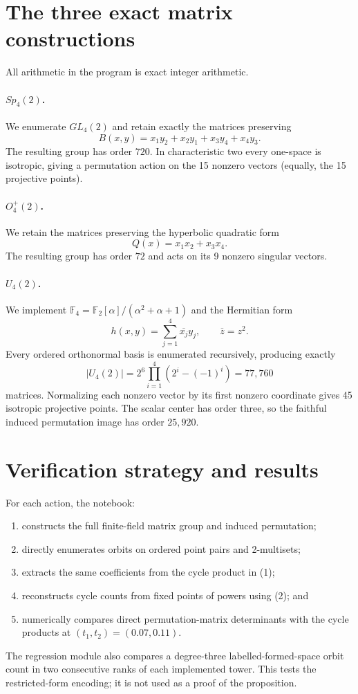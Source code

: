\documentclass[10pt]{article}
\newcommand{\F}{\mathbb F}
\begin{document}
\section{The three exact matrix constructions}
All arithmetic in the program is exact integer arithmetic.

\paragraph{$Sp_4(2)$.}
We enumerate $GL_4(2)$ and retain exactly the matrices preserving
\[
 B(x,y)=x_1y_2+x_2y_1+x_3y_4+x_4y_3.
\]
The resulting group has order $720$.  In characteristic two every one-space
is isotropic, giving a permutation action on the 15 nonzero vectors (equally,
the 15 projective points).

\paragraph{$O_4^+(2)$.}
We retain the matrices preserving the hyperbolic quadratic form
\[
 Q(x)=x_1x_2+x_3x_4.
\]
The resulting group has order $72$ and acts on its 9 nonzero singular vectors.

\paragraph{$U_4(2)$.}
We implement $\F_4=\F_2[\alpha]/(\alpha^2+\alpha+1)$ and the Hermitian form
\[
 h(x,y)=\sum_{j=1}^4\overline{x_j}y_j,\qquad \overline z=z^2.
\]
Every ordered orthonormal basis is enumerated recursively, producing exactly
\[
 |U_4(2)|=2^6\prod_{i=1}^4(2^i-(-1)^i)=77{,}760
\]
matrices.  Normalizing each nonzero vector by its first nonzero coordinate
gives 45 isotropic projective points.  The scalar center has order three, so
the faithful induced permutation image has order $25{,}920$.

\section{Verification strategy and results}
For each action, the notebook:
\begin{enumerate}
 \item constructs the full finite-field matrix group and induced permutation;
 \item directly enumerates orbits on ordered point pairs and 2-multisets;
 \item extracts the same coefficients from the cycle product in (1);
 \item reconstructs cycle counts from fixed points of powers using (2); and
 \item numerically compares direct permutation-matrix determinants with the
 cycle products at $(t_1,t_2)=(0.07,0.11)$.
\end{enumerate}
The regression module also compares a degree-three labelled-formed-space
orbit count in two consecutive ranks of each implemented tower.  This tests
the restricted-form encoding; it is not used as a proof of the proposition.
\end{document}
